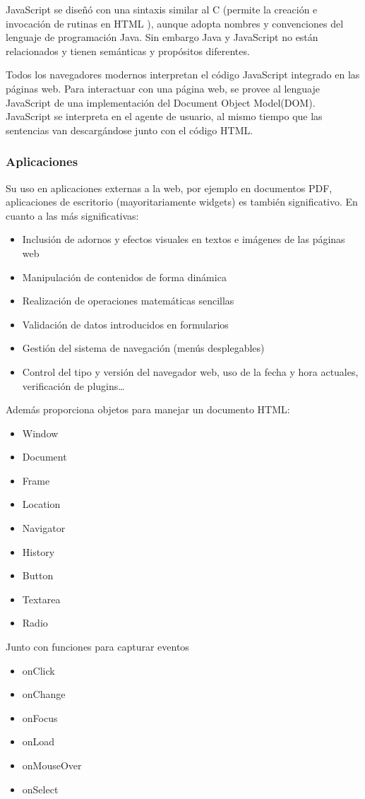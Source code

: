 \documentclass{apuntes}
\begin{document}
JavaScript se diseñó con una sintaxis similar al C (permite la creación e invocación de rutinas en HTML ), aunque adopta nombres y convenciones del lenguaje de programación Java. Sin embargo Java y JavaScript no están relacionados y tienen semánticas y propósitos diferentes.

Todos los navegadores modernos interpretan el código JavaScript integrado en las páginas web. Para interactuar con una página web, se provee al lenguaje JavaScript de una implementación del Document Object Model(DOM).
JavaScript se interpreta en el agente de usuario, al mismo tiempo que las sentencias van descargándose junto con el código HTML.

\subsubsection{Aplicaciones}
 Su uso en aplicaciones externas a la web, por ejemplo en documentos PDF, aplicaciones de escritorio (mayoritariamente widgets) es también significativo. En cuanto a las más significativas:
\begin{itemize}
\item Inclusión de adornos y efectos visuales en textos e imágenes 
de las páginas web
\item Manipulación de contenidos de forma dinámica
\item Realización de operaciones matemáticas sencillas
\item Validación de datos introducidos en formularios
\item Gestión del sistema de navegación (menús desplegables)
\item Control del tipo y versión del navegador web, uso de la fecha y 
hora actuales, verificación de plugins…
\end{itemize}
Además proporciona objetos para manejar un documento HTML:
\begin{itemize}
\item Window \item Document \item Frame \item Location  \item Navigator \item History \item Button  \item Textarea \item Radio
\end{itemize}
Junto con funciones para capturar  eventos
\begin{itemize}
\item onClick \item onChange \item onFocus \item onLoad \item onMouseOver \item onSelect
 \end{itemize}
\end{document}
